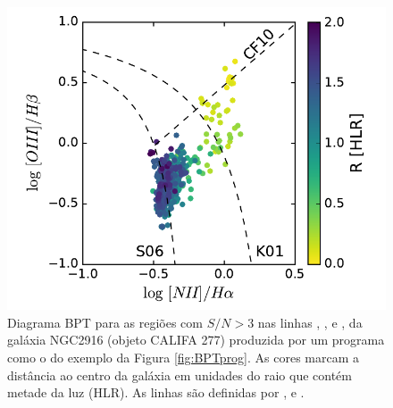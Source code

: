 \begin{figure}
	\centering
	\includegraphics[scale=0.6]{figuras/K0277-BPT.pdf}
	\caption[Diagrama BPT da galáxia NGC2916]
	{Diagrama BPT para as regiões com $S/N > 3$ nas linhas \Hb, \OIII, \Ha e \NII, da galáxia
NGC2916 (objeto CALIFA 277) produzida por um programa como o do exemplo da Figura \ref{fig:BPTprog}.
As cores marcam a distância ao centro da galáxia em unidades do raio que contém metade da luz (HLR). As
linhas são definidas por \citet[][K01]{Kewley.etal.2001a}, \citet[][S06]{Stasinska.etal.2006a} e
\citet[][CF10]{CidFernandes.etal.2010a}.}
	\label{fig:BPTfig}
\end{figure}


